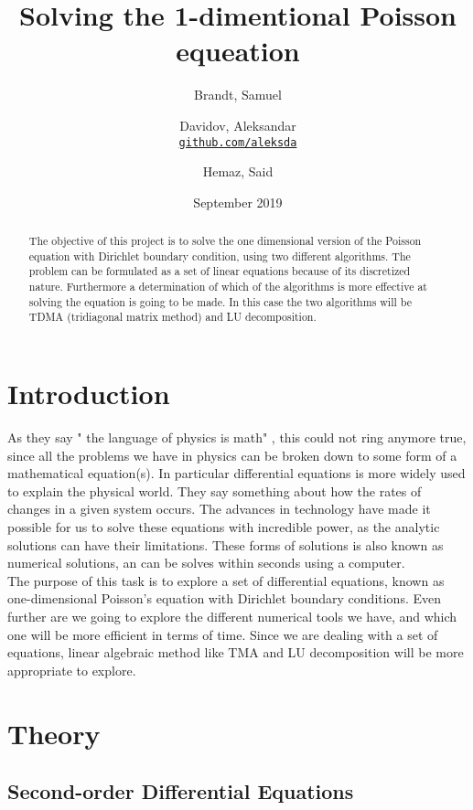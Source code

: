 \documentclass{article}
\title{Solving the 1-dimentional Poisson equeation}
\author{
  Brandt, Samuel\\
  \and
  Davidov, Aleksandar\\
  \textcolor{blue}{\href{https://github.com/aleksda/FYS4150/}{\texttt{github.com/aleksda}}}
  \and
  Hemaz, Said\\
}
\date{September 2019}
\begin{document}
\maketitle
\begin{abstract}
The objective of this project is to solve the one dimensional version of the Poisson equation with Dirichlet boundary condition, using two different algorithms. The problem can be formulated as a set of linear equations because of its discretized nature.  Furthermore a determination of which of the algorithms is more effective at solving the equation is going to be made. In this case the two algorithms will be TDMA (tridiagonal matrix method) and LU decomposition.

\end{abstract}
\tableofcontents

\section{Introduction}
As they say " the language of physics is math" , this could not ring anymore true, since all the problems we have in physics can be broken down to some form of a mathematical equation(s). In particular differential equations is more widely used to explain the physical world. They say something about how the rates of changes in a given system occurs. The advances in technology have made it possible for us to solve these equations with incredible power, as the analytic solutions can have their limitations. These forms of solutions is also known as numerical solutions, an can be solves within seconds using a computer. \\

The purpose of this task is to explore a set of differential equations, known as one-dimensional Poisson's equation with Dirichlet boundary conditions. Even further are we going to explore the different numerical tools we have, and which one will be more efficient in terms of time. Since we are dealing with a set of equations, linear algebraic method like TMA and LU decomposition will be more appropriate to explore. 

\section{Theory}
\subsection{Second-order Differential Equations}
\end{document}
